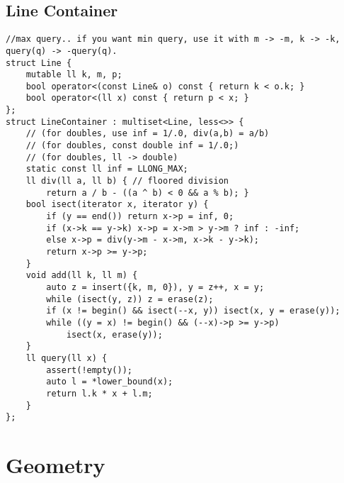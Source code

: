 \documentclass[landscape, 8pt, a4paper, oneside, twocolumn]{extarticle}
\begin{document}
\subsection {Line Container}
\begin{verbatim}
//max query.. if you want min query, use it with m -> -m, k -> -k, query(q) -> -query(q).
struct Line {
	mutable ll k, m, p;
	bool operator<(const Line& o) const { return k < o.k; }
	bool operator<(ll x) const { return p < x; }
};
struct LineContainer : multiset<Line, less<>> {
	// (for doubles, use inf = 1/.0, div(a,b) = a/b)
	// (for doubles, const double inf = 1/.0;)
	// (for doubles, ll -> double)
	static const ll inf = LLONG_MAX;
	ll div(ll a, ll b) { // floored division
		return a / b - ((a ^ b) < 0 && a % b); }
	bool isect(iterator x, iterator y) {
		if (y == end()) return x->p = inf, 0;
		if (x->k == y->k) x->p = x->m > y->m ? inf : -inf;
		else x->p = div(y->m - x->m, x->k - y->k);
		return x->p >= y->p;
	}
	void add(ll k, ll m) {
		auto z = insert({k, m, 0}), y = z++, x = y;
		while (isect(y, z)) z = erase(z);
		if (x != begin() && isect(--x, y)) isect(x, y = erase(y));
		while ((y = x) != begin() && (--x)->p >= y->p)
			isect(x, erase(y));
	}
	ll query(ll x) {
		assert(!empty());
		auto l = *lower_bound(x);
		return l.k * x + l.m;
	}
};
\end{verbatim}
\newpage
\section{Geometry}
\end{document}
